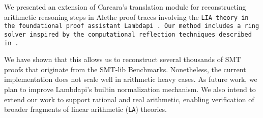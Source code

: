 \documentclass[runningheads]{llncs}
\begin{document}
We presented an extension of Carcara's \cite{carcara} translation module \cite{ColtellacciMD24} for reconstructing arithmetic reasoning steps in Alethe proof traces involving the \tt{LIA} theory in the foundational proof assistant Lambdapi \cite{lambdapi}.
Our method includes a ring solver inspired by the computational reflection techniques described in \cite{ring-Boutin,RingRight}.

We have shown that this allows us to reconstruct several thousands of SMT proofs that originate from the SMT-lib Benchmarks.
Nonetheless, the current implementation does not scale well in arithmetic heavy cases.
As future work, we plan to improve Lambdapi’s builtin normalization mechanism.
We also intend to extend our work to support rational and real arithmetic, enabling verification of broader fragments of linear arithmetic (\texttt{LA}) theories.





\end{document}

